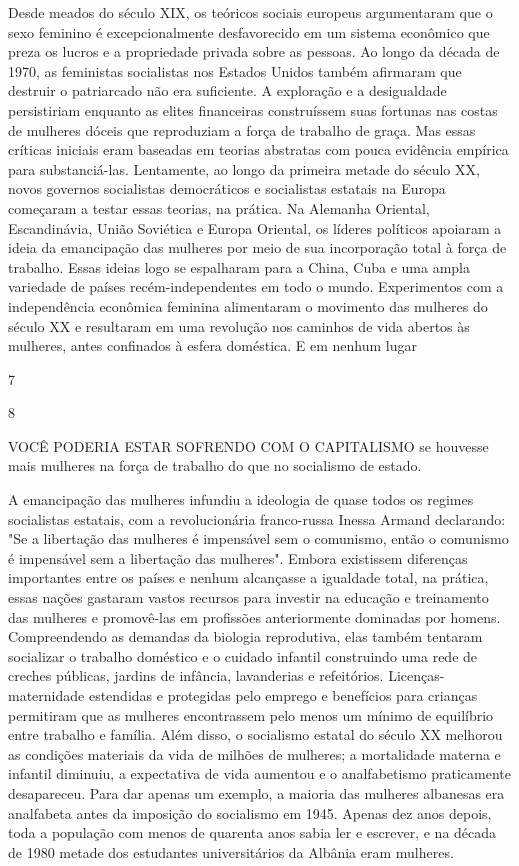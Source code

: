  \par 
Desde meados do século XIX, os teóricos sociais europeus argumentaram que o sexo feminino é excepcionalmente desfavorecido em um sistema econômico que preza os lucros e a propriedade privada sobre as pessoas. Ao longo da década de 1970, as feministas socialistas nos Estados Unidos também afirmaram que destruir o patriarcado não era suficiente. A exploração e a desigualdade persistiriam enquanto as elites financeiras construíssem suas fortunas nas costas de mulheres dóceis que reproduziam a força de trabalho de graça. Mas essas críticas iniciais eram baseadas em teorias abstratas com pouca evidência empírica para substanciá-las. Lentamente, ao longo da primeira metade do século XX, novos governos socialistas democráticos e socialistas estatais na Europa começaram a testar essas teorias, na prática. Na Alemanha Oriental, Escandinávia, União Soviética e Europa Oriental, os líderes políticos apoiaram a ideia da emancipação das mulheres por meio de sua incorporação total à força de trabalho. Essas ideias logo se espalharam para a China, Cuba e uma ampla variedade de países recém-independentes em todo o mundo. Experimentos com a independência econômica feminina alimentaram o movimento das mulheres do século XX e resultaram em uma revolução nos caminhos de vida abertos às mulheres, antes confinados à esfera doméstica. E em nenhum lugar
 \par 
7
 \par 
8
 \par 
VOCÊ PODERIA ESTAR SOFRENDO COM O CAPITALISMO se houvesse mais mulheres na força de trabalho do que no socialismo de estado.
 \par 
A emancipação das mulheres infundiu a ideologia de quase todos os regimes socialistas estatais, com a revolucionária franco-russa Inessa Armand declarando: "Se a libertação das mulheres é impensável sem o comunismo, então o comunismo é impensável sem a libertação das mulheres". Embora existissem diferenças importantes entre os países e nenhum alcançasse a igualdade total, na prática, essas nações gastaram vastos recursos para investir na educação e treinamento das mulheres e promovê-las em profissões anteriormente dominadas por homens. Compreendendo as demandas da biologia reprodutiva, elas também tentaram socializar o trabalho doméstico e o cuidado infantil construindo uma rede de creches públicas, jardins de infância, lavanderias e refeitórios. Licenças-maternidade estendidas e protegidas pelo emprego e benefícios para crianças permitiram que as mulheres encontrassem pelo menos um mínimo de equilíbrio entre trabalho e família. Além disso, o socialismo estatal do século XX melhorou as condições materiais da vida de milhões de mulheres; a mortalidade materna e infantil diminuiu, a expectativa de vida aumentou e o analfabetismo praticamente desapareceu. Para dar apenas um exemplo, a maioria das mulheres albanesas era analfabeta antes da imposição do socialismo em 1945. Apenas dez anos depois, toda a população com menos de quarenta anos sabia ler e escrever, e na década de 1980 metade dos estudantes universitários da Albânia eram mulheres.
